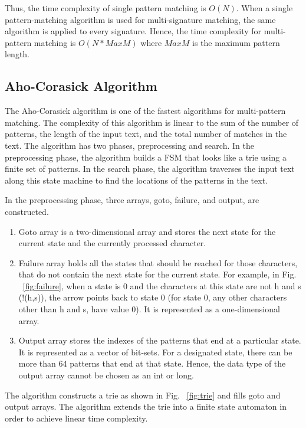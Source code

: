 Thus, the time complexity of single pattern matching is $O(N)$. When a single pattern-matching algorithm is used for multi-signature matching, the same algorithm is applied to every signature. Hence, the time complexity for multi-pattern matching is $O(N*MaxM)$ where $MaxM$ is the maximum pattern length.

\subsection{Aho-Corasick Algorithm}
The Aho-Corasick algorithm \cite{bib18} is one of the fastest algorithms for multi-pattern matching. The complexity of this algorithm is linear to the sum of the number of patterns, the length of the input text, and the total number of matches in the text. The algorithm has two phases, preprocessing and search. In the preprocessing phase, the algorithm builds a FSM that looks like a trie using a finite set of patterns. In the search phase, the algorithm traverses the input text along this state machine to find the locations of the patterns in the text.

In the preprocessing phase, three arrays, goto, failure, and output, are constructed.
\begin{enumerate}
	\item Goto array is a two-dimensional array and stores the next state for the current state and the currently processed character.  
	
	\item Failure array holds all the states that should be reached for those characters, that do not contain the next state for the current state. For example, in Fig. ~\ref{fig:failure}, when a state is 0 and the characters at this state are not h and s (!(h,s)), the arrow points back to state 0 (for state 0, any other characters other than h and s, have value 0). It is represented as a one-dimensional array.
	
	\item Output array stores the indexes of the patterns that end at a particular state. It is represented as a vector of bit-sets. For a designated state, there can be more than 64 patterns that end at that state. Hence, the data type of the output array cannot be chosen as an int or long. 
\end{enumerate}
\vspace{\topsep}

The algorithm constructs a trie as shown in Fig. ~\ref{fig:trie} and fills goto and output arrays. The algorithm extends the trie into a finite state automaton in order to achieve linear time complexity.

